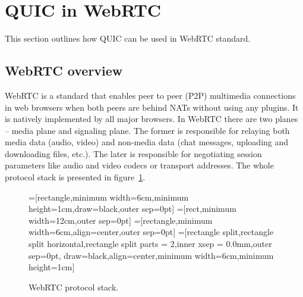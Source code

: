 \section{QUIC in WebRTC}
\label{sec:quic-in-webrtc}
This section outlines how QUIC can be used in WebRTC standard.

\subsection{WebRTC overview}
\label{subsec:webrtc-overview}
WebRTC is a standard that enables peer to peer (P2P) multimedia connections in web browsers when both peers are behind NATs without using any plugins.
It is natively implemented by all major browsers.
In WebRTC there are two planes -- media plane and signaling plane.
The former is responsible for relaying both media data (audio, video) and non-media data (chat messages, uploading and downloading files, etc.).
The later is responsible for negotiating session parameters like audio and video codecs or transport addresses.
The whole protocol stack is presented in figure~\ref{fig:webrtc-stack}.

\begin{figure}
    \centering
    =[rectangle,minimum width=6cm,minimum height=1cm,draw=black,outer sep=0pt]
    =[rect,minimum width=12cm,outer sep=0pt]
    =[rectangle,minimum width=6cm,align=center,outer sep=0pt]
    =[rectangle split,rectangle split horizontal,rectangle split parts = 2,inner xsep = 0.0mm,outer sep=0pt,
    draw=black,align=center,minimum width=6cm,minimum height=1cm]
    \caption{WebRTC protocol stack.}
    \label{fig:webrtc-stack}
\end{figure}

